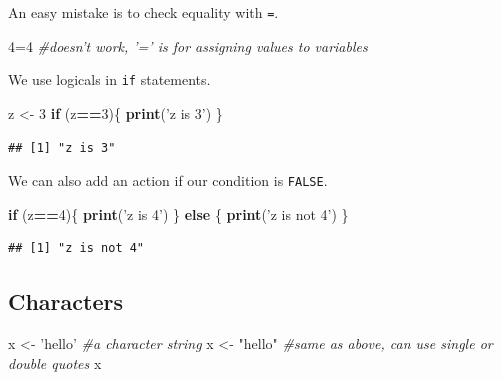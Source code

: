 \documentclass[]{article}
\newenvironment{Shaded}{\begin{snugshade}}{\end{snugshade}}
\newcommand{\KeywordTok}[1]{\textcolor[rgb]{0.13,0.29,0.53}{\textbf{#1}}}
\newcommand{\DecValTok}[1]{\textcolor[rgb]{0.00,0.00,0.81}{#1}}
\newcommand{\StringTok}[1]{\textcolor[rgb]{0.31,0.60,0.02}{#1}}
\newcommand{\CommentTok}[1]{\textcolor[rgb]{0.56,0.35,0.01}{\textit{#1}}}
\newcommand{\ControlFlowTok}[1]{\textcolor[rgb]{0.13,0.29,0.53}{\textbf{#1}}}
\newcommand{\OperatorTok}[1]{\textcolor[rgb]{0.81,0.36,0.00}{\textbf{#1}}}
\newcommand{\NormalTok}[1]{#1}
\begin{document}
An easy mistake is to check equality with \texttt{=}.

\begin{Shaded}
\begin{Highlighting}[]
\DecValTok{4}\NormalTok{=}\DecValTok{4} \CommentTok{#doesn't work, '=' is for assigning values to variables}
\end{Highlighting}
\end{Shaded}

We use logicals in \texttt{if} statements.

\begin{Shaded}
\begin{Highlighting}[]
\NormalTok{z <-}\StringTok{ }\DecValTok{3}
\ControlFlowTok{if}\NormalTok{ (z}\OperatorTok{==}\DecValTok{3}\NormalTok{)\{ }
  \KeywordTok{print}\NormalTok{(}\StringTok{'z is 3'}\NormalTok{) }
\NormalTok{\}}
\end{Highlighting}
\end{Shaded}

\begin{verbatim}
## [1] "z is 3"
\end{verbatim}

We can also add an action if our condition is \texttt{FALSE}.

\begin{Shaded}
\begin{Highlighting}[]
\ControlFlowTok{if}\NormalTok{ (z}\OperatorTok{==}\DecValTok{4}\NormalTok{)\{ }
  \KeywordTok{print}\NormalTok{(}\StringTok{'z is 4'}\NormalTok{) }
\NormalTok{\} }\ControlFlowTok{else}\NormalTok{ \{}
  \KeywordTok{print}\NormalTok{(}\StringTok{'z is not 4'}\NormalTok{)}
\NormalTok{\}}
\end{Highlighting}
\end{Shaded}

\begin{verbatim}
## [1] "z is not 4"
\end{verbatim}

\subsection{Characters}\label{characters}

\begin{Shaded}
\begin{Highlighting}[]
\NormalTok{x <-}\StringTok{ 'hello'} \CommentTok{#a character string}
\NormalTok{x <-}\StringTok{ "hello"} \CommentTok{#same as above, can use single or double quotes}
\NormalTok{x}
\end{Highlighting}
\end{Shaded}
\end{document}
